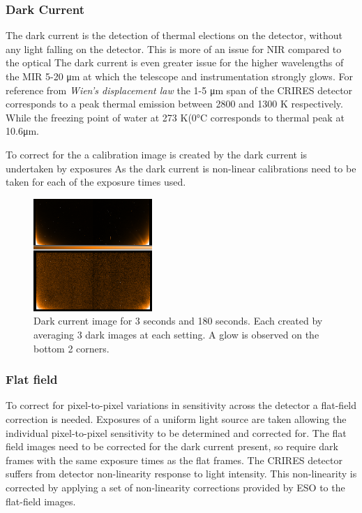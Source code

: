\subsubsection{Dark Current}
The dark current is the detection of thermal elections on the detector, without any light falling on the detector. This is more of an issue for NIR compared to the optical  The dark current is even greater issue for the higher wavelengths of the MIR 5-20  \si{\micro\meter} at which the telescope and instrumentation strongly glows. 
For reference from \emph{Wien's displacement law} the 1-5 \si{\micro\meter} span of the CRIRES detector corresponds to a peak thermal emission between 2800 and 1300 K respectively.  
While the freezing point of water at 273 K(0\si{\celsius} corresponds to thermal peak at 10.6\si{\micro\meter}.

To correct for the a calibration image is created by  the dark current is undertaken by exposures
As the dark current is non-linear calibrations need to be taken for each of the exposure times used. 


\begin{figure}
\includegraphics[width=0.4\textwidth]{figures/reduction/Master_Darks.png}
\caption{Dark current image for 3 seconds and 180 seconds. Each created by averaging 3 dark images at each setting. A glow is observed on the bottom 2 corners.}
\end{figure}



\subsubsection{Flat field}
To correct for pixel-to-pixel variations in sensitivity across the detector a flat-field correction is needed. Exposures of a uniform light source are taken allowing the individual pixel-to-pixel sensitivity to be determined and corrected for. The flat field images need to be corrected for the dark current present, so require dark frames with the same exposure times as the flat frames.
The CRIRES detector suffers from detector non-linearity response to light intensity. This non-linearity is corrected by applying a set of non-linearity corrections provided by ESO to the flat-field images.  


